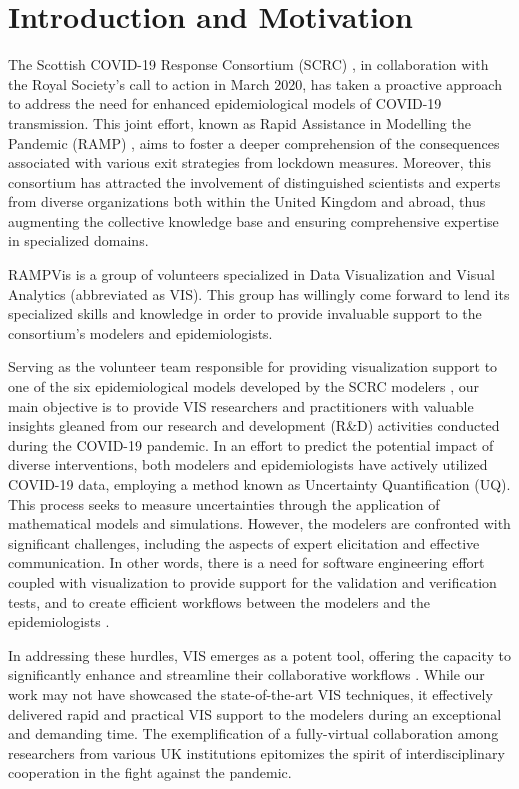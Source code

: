 \section{Introduction and Motivation}
\label{sec:intro}

The Scottish COVID-19 Response Consortium (SCRC) \cite{2020University}, in collaboration with the Royal Society's call to action in March 2020, has taken a proactive approach to address the need for enhanced epidemiological models of COVID-19 transmission.
This joint effort, known as Rapid Assistance in Modelling the Pandemic (RAMP) \cite{2020Rapid}, aims to foster a deeper comprehension of the consequences associated with various exit strategies from lockdown measures.
Moreover, this consortium has attracted the involvement of distinguished scientists and experts from diverse organizations both within the United Kingdom and abroad, thus augmenting the collective knowledge base and ensuring comprehensive expertise in specialized domains.

RAMPVis \cite{2020Visualization} is a group of volunteers specialized in Data Visualization and Visual Analytics (abbreviated as VIS).
This group has willingly come forward to lend its specialized skills and knowledge in order to provide invaluable support to the consortium's modelers and epidemiologists.

Serving as the volunteer team responsible for providing visualization support to one of the six epidemiological models developed by the SCRC modelers \cite{chen2022RAMPVIS}, our main objective is to provide VIS researchers and practitioners with valuable insights gleaned from our research and development (R\&D) activities conducted during the COVID-19 pandemic.
In an effort to predict the potential impact of diverse interventions, both modelers and epidemiologists have actively utilized COVID-19 data, employing a method known as Uncertainty Quantification (UQ).
This process seeks to measure uncertainties through the application of mathematical models and simulations.
However, the modelers are confronted with significant challenges, including the aspects of expert elicitation and effective communication.
In other words, there is a need for software engineering effort coupled with visualization to provide support for the validation and verification tests, and to create efficient workflows between the modelers and the epidemiologists \cite{ackland2022Royal}.

In addressing these hurdles, \ac{VIS} emerges as a potent tool, offering the capacity to significantly enhance and streamline their collaborative workflows \cite{swallow2022Challenges}.
While our work may not have showcased the state-of-the-art VIS techniques, it effectively delivered rapid and practical VIS support to the modelers during an exceptional and demanding time.
The exemplification of a fully-virtual collaboration among researchers from various UK institutions epitomizes the spirit of interdisciplinary cooperation in the fight against the pandemic.


